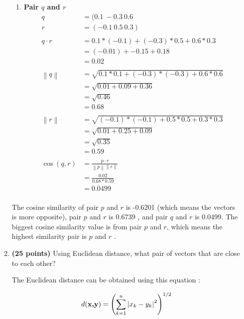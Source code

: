 \documentclass[12pt]{article}%
\begin{document}
\begin{enumerate}
\begin{enumerate}
\begin{enumerate}
			\item \textbf{Pair $q$ and $r$}
			\begin{align*}
				 q & = (0.1 \ -0.3 \ 0.6 \\ 
				 r & = (-0.1 \ 0.5 \ 0.3) \\ 
				 \\
				 q \cdot r & = 0.1 * (-0.1) + (-0.3) * 0.5 + 0.6 * 0.3 \\
				 & = (-0.01) + -0.15 + 0.18 \\
				 & = 0.02\\ 
				 \\
				\left \| q \right \| & = \sqrt{0.1 * 0.1 + (-0.3) * (-0.3) + 0.6*0.6} \\
				 & = \sqrt{0.01 + 0.09 + 0.36} \\ 
				 & = \sqrt{0.46} \\
				 & = 0.68 \\
				 \\
				 \left \| r \right \| & = \sqrt{(-0.1) * (-0.1) + 0.5 * 0.5 + 0.3*0.3} \\
				 & = \sqrt{0.01 + 0.25 + 0.09} \\ 
				 & = \sqrt{0.35} \\
				 & = 0.59 \\
				 \\
				 \cos (q,r) & = \frac{p\cdot r}{\left \| p \right \| \left \| r \right \|} \\
				 & = \frac{0.02}{0.68 * 0.59} \\
				 & = 0.0499\\ %
			\end{align*}
		\end{enumerate}

		\par The cosine similarity of pair $p$ and $r$ is -0.6201 (which means the vectors is more opposite), pair $p$ and $r$ is 0.6739 , and pair $q$ and $r$ is 0.0499. The biggest cosine similarity value is from pair $p$ and $r$, which means the highest similarity pair is $p$ and $r$ .


		\item \textbf{(25 points)} Using Euclidean distance, what pair of vectors that are close to each other?
		\par The Euclidean distance can be obtained using this equation : 

		\begin{equation}
			d(\textbf{\textup{x,y}}) = \left ( \sum_{k=1}^{n} \left | x_k - y_k \right |^2 \right)^{1/2}
		\end{equation}


\end{enumerate}
\end{enumerate}
\end{document}

